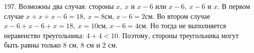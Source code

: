 197. Возможны два случая: стороны $x,\ x$ и $x-6$ или $x-6,\ x-6$ и $x.$ В первом случае $x+x+x-6=18,\ x=8$см, $x-6=2$см. Во втором случае $x-6+x-6+x=18,\ x=10$см, $x-6=4$см. Но тогда не выполняется неравенство треугольника: $4+4<10.$ Поэтому, стороны треугольника могут быть равны только 8 см, 8 см и 2 см.\\
